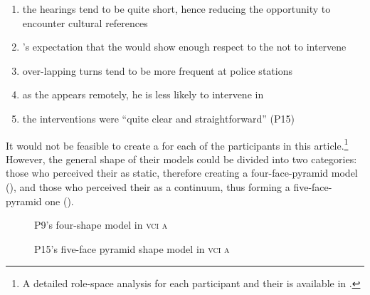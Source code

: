 \documentclass[output=paper]{langsci/langscibook}
\begin{document}
\begin{enumerate}
\item the hearings tend to be quite short, hence reducing the opportunity to encounter cultural references 
\item {}’s expectation that the  would show enough respect to the  not to intervene 
\item over-lapping turns tend to be more frequent at police stations 
\item as the  appears remotely, he is less likely to intervene in  
\item the interventions were “quite clear and straightforward” (P15)
\end{enumerate}

It would not be feasible to create a  for each of the participants in this article.\footnote{A detailed role-space analysis for each participant and their  is available in \citet{Devaux2017b}.} However, the general shape of their models could be divided into two categories: those who perceived their  as static, therefore creating a four-face-pyramid model (), and those who perceived their  as a continuum, thus forming a five-face-pyramid one ().  
 

\begin{figure}[p]
\caption{P9's four-shape model in \textsc{vci a}\label{fig:devaux:3}}
\end{figure}

\begin{figure}[p]
\caption{P15's five-face pyramid shape model in \textsc{vci a}\label{fig:devaux:4}}
\end{figure}
\end{document}
